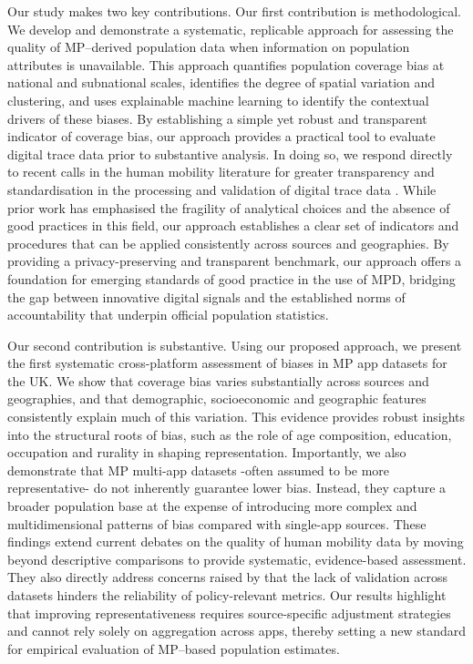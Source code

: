 \documentclass[]{rsos}%
\begin{document}
Our study makes two key contributions. Our first contribution is
methodological. We develop and demonstrate a systematic, replicable
approach for assessing the quality of MP--derived population data when
information on population attributes is unavailable. This approach
quantifies population coverage bias at national and subnational scales,
identifies the degree of spatial variation and clustering, and uses
explainable machine learning to identify the contextual drivers of these
biases. By establishing a simple yet robust and transparent indicator of
coverage bias, our approach provides a practical tool to evaluate
digital trace data prior to substantive analysis. In doing so, we
respond directly to recent calls in the human mobility literature for
greater transparency and standardisation in the processing and
validation of digital trace data \citep{barreras2024exciting, unstatsMPDMS2025, UKGovPopulationMovement2025}. While prior work has
emphasised the fragility of analytical choices and the absence of good
practices in this field, our approach establishes a clear set of
indicators and procedures that can be applied consistently across
sources and geographies. By providing a privacy-preserving and
transparent benchmark, our approach offers a foundation for emerging
standards of good practice in the use of MPD, bridging the gap between
innovative digital signals and the established norms of accountability
that underpin official population statistics.

Our second contribution is substantive. Using our proposed approach, we
present the first systematic cross-platform assessment of biases in MP
app datasets for the UK. We show that coverage bias varies substantially
across sources and geographies, and that demographic, socioeconomic and
geographic features consistently explain much of this variation. This
evidence provides robust insights into the structural roots of bias,
such as the role of age composition, education, occupation and rurality
in shaping representation. Importantly, we also demonstrate that MP
multi-app datasets -often assumed to be more representative- do not
inherently guarantee lower bias. Instead, they capture a broader
population base at the expense of introducing more complex and
multidimensional patterns of bias compared with single-app sources.
These findings extend current debates on the quality of human mobility
data by moving beyond descriptive comparisons to provide systematic,
evidence-based assessment. They also directly address concerns raised by
\citep{barreras2024exciting} that the lack of validation across datasets
hinders the reliability of policy-relevant metrics. Our results
highlight that improving representativeness requires source-specific
adjustment strategies and cannot rely solely on aggregation across apps,
thereby setting a new standard for empirical evaluation of MP--based
population estimates.
\end{document}
